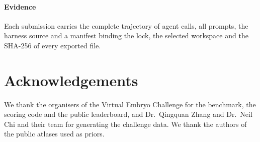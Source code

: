 \documentclass[9pt,twocolumn,a4paper]{extarticle}
\begin{document}
\paragraph{Evidence} Each submission carries the complete trajectory of agent calls, all prompts, the harness source
and a manifest binding the lock, the selected workspace and the SHA-256 of every exported file.

\section*{Acknowledgements}
\noindent We thank the organisers of the Virtual Embryo Challenge for the benchmark, the scoring code and the public
leaderboard, and Dr.~Qingquan Zhang and Dr.~Neil Chi and their team for generating the challenge data. We thank the
authors of the public atlases used as priors.
\end{document}
